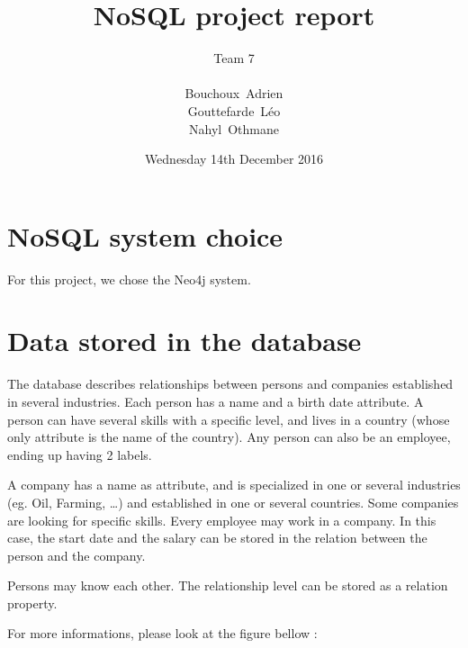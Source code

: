 \documentclass[a4paper, 11pt, titlepage]{article}
\title {{ {\huge NoSQL project report }} }
\author{\Large Team 7 \\
\\
    {\sc Bouchoux}~Adrien\\
    {\sc Gouttefarde}~Léo\\
    {\sc Nahyl}~Othmane
}
\date{Wednesday 14th December 2016}
\begin{document}
\pagestyle{fancy}
\maketitle

\setcounter{tocdepth}{2}

\tableofcontents
\newpage



\section {NoSQL system choice}

For this project, we chose the Neo4j system.


\section {Data stored in the database}


The database describes relationships between persons and companies established in several industries. Each person has a name and a birth date attribute. A person can have several skills with a specific level, and lives in a country (whose only attribute is the name of the country). Any person can also be an employee, ending up having 2 labels.

A company has a name as attribute, and is specialized in one or several industries (eg. Oil, Farming, …) and established in one or several countries.
Some companies are looking for specific skills. Every employee may work in a company. In this case, the start date and the salary can be stored in the relation between the person and the company.

Persons may know each other. The relationship level can be stored as a relation property.

For more informations, please look at the figure bellow :
\end{document}

